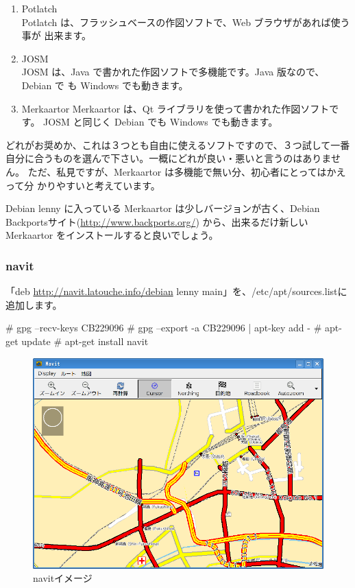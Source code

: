 \documentclass[mingoth,a4paper]{jsarticle}
\begin{document}
\begin{enumerate}
 \item Potlatch \\
Potlatch は、フラッシュベースの作図ソフトで、Web ブラウザがあれば使う事が
出来ます。
 \item JOSM \\
JOSM は、Java で書かれた作図ソフトで多機能です。Java 版なので、Debian で
も Windows でも動きます。
 \item Merkaartor
Merkaartor は、Qt ライブラリを使って書かれた作図ソフトです。
JOSM と同じく Debian でも Windows でも動きます。
\end{enumerate}

どれがお奨めか、これは３つとも自由に使えるソフトですので、３つ試して一番
自分に合うものを選んで下さい。一概にどれが良い・悪いと言うのはありません。
ただ、私見ですが、Merkaartor は多機能で無い分、初心者にとってはかえって分
かりやすいと考えています。

Debian lenny に入っている Merkaartor は少しバージョンが古く、Debian
Backportsサイト(\url{http://www.backports.org/}) から、出来るだけ新しい
Merkaartor をインストールすると良いでしょう。

\subsubsection{navit}

「deb \url{http://navit.latouche.info/debian} lenny main」を、/etc/apt/sources.listに追加します。

\begin{commandline}
# gpg --recv-keys CB229096
# gpg --export -a CB229096 | apt-key add -
# apt-get update
# apt-get install navit
\end{commandline}

\begin{figure}
 \includegraphics[scale=0.38]{image200912/debianosm8.png}
 \caption{navitイメージ}
 \label{fig:debianosm8}
\end{figure}
\end{document}
